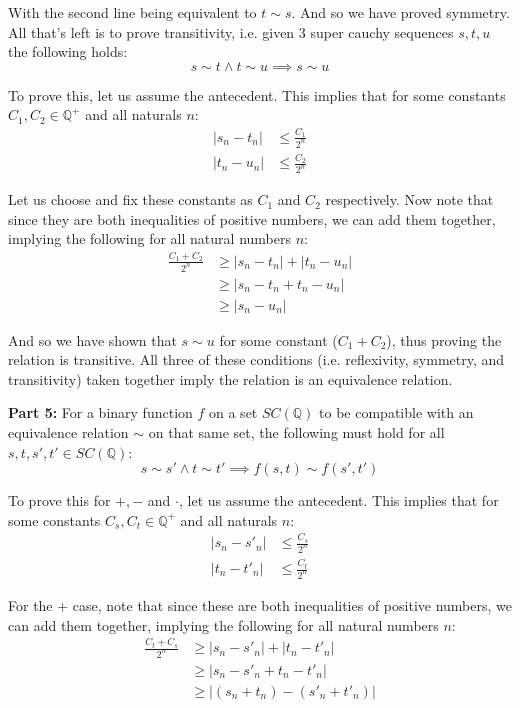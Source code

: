 \documentclass{article}
\begin{document}
With the second line being equivalent to $t\sim s$. And so we have proved symmetry. All that's left is to prove transitivity, i.e. given 3 super cauchy sequences $s,t,u$ the following holds:
\begin{equation*}
    s\sim t\wedge t\sim u\implies s\sim u
\end{equation*}

To prove this, let us assume the antecedent. This implies that for some constants $C_1,C_2\in\mathbb Q^+$ and all naturals $n$:
\setcounter{equation}{0}
\begin{align}
    |s_n-t_n|&\le\frac{C_1}{2^n}\\
    |t_n-u_n|&\le\frac{C_2}{2^n}
\end{align}

Let us choose and fix these constants as $C_1$ and $C_2$ respectively. Now note that since they are both inequalities of positive numbers, we can add them together, implying the following for all natural numbers $n$:
\begin{align*}
    \frac{C_1+C_2}{2^n}&\ge|s_n-t_n|+|t_n-u_n|\tag{sum of (1) and (2)}\\
    &\ge|s_n-t_n+t_n-u_n|\tag{triangle inequality}\\
    &\ge|s_n-u_n|
\end{align*}

And so we have shown that $s\sim u$ for some constant ($C_1+C_2$), thus proving the relation is transitive. All three of these conditions (i.e. reflexivity, symmetry, and transitivity) taken together imply the relation is an equivalence relation.
\bigskip

\noindent\textbf{Part 5:} For a binary function $f$ on a set $SC(\mathbb Q)$ to be compatible with an equivalence relation $\sim$ on that same set, the following must hold for all $s,t,s',t'\in SC(\mathbb Q)$:
\begin{equation*}
    s\sim s'\wedge t\sim t'\implies f(s,t)\sim f(s',t')
\end{equation*}

To prove this for $+,-$ and $\cdot$, let us assume the antecedent. This implies that for some constants $C_s,C_t\in\mathbb Q^+$ and all naturals $n$:
\setcounter{equation}{0}
\begin{align}
    |s_n-s'_n|&\le\frac{C_s}{2^n}\\
    |t_n-t'_n|&\le\frac{C_t}{2^n}
\end{align}

For the $+$ case, note that since these are both inequalities of positive numbers, we can add them together, implying the following for all natural numbers $n$:
\begin{align*}
    \frac{C_t+C_s}{2^n}&\ge|s_n-s'_n|+|t_n-t'_n|\tag{sum of (1) and (2)}\\
    &\ge|s_n-s'_n+t_n-t'_n|\tag{triangle inequality}\\
    &\ge|(s_n+t_n)-(s'_n+t'_n)|\tag{assoc., comm., \& distr. prop. of $\mathbb Q$}
\end{align*}
\end{document}
